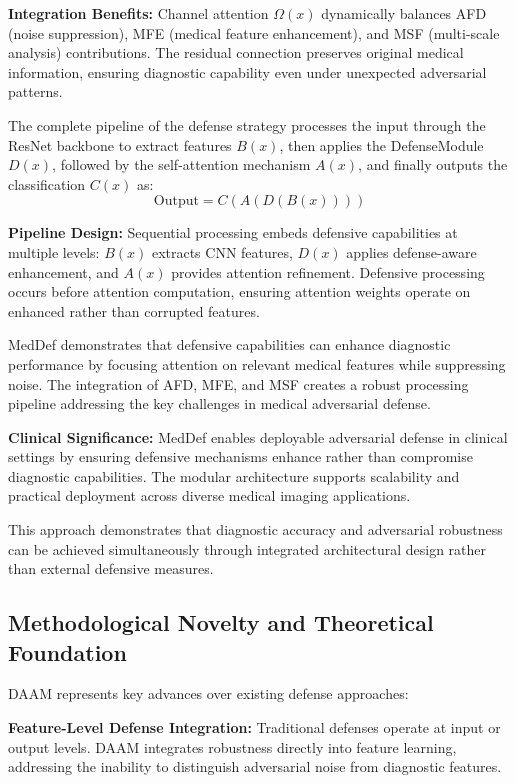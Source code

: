 \documentclass[preprint,12pt]{elsarticle}
\begin{document}
\textbf{Integration Benefits:} Channel attention $\Omega(x)$ dynamically balances AFD (noise suppression), MFE (medical feature enhancement), and MSF (multi-scale analysis) contributions. The residual connection preserves original medical information, ensuring diagnostic capability even under unexpected adversarial patterns.

The complete pipeline of the defense strategy processes the input through the ResNet backbone to extract features $B(x)$, then applies the DefenseModule $D(x)$, followed by the self-attention mechanism $A(x)$, and finally outputs the classification $C(x)$ as:
\begin{equation}
\text{Output} = C(A(D(B(x))))
\end{equation}

\textbf{Pipeline Design:} Sequential processing embeds defensive capabilities at multiple levels: $B(x)$ extracts CNN features, $D(x)$ applies defense-aware enhancement, and $A(x)$ provides attention refinement. Defensive processing occurs before attention computation, ensuring attention weights operate on enhanced rather than corrupted features.

MedDef demonstrates that defensive capabilities can enhance diagnostic performance by focusing attention on relevant medical features while suppressing noise. The integration of AFD, MFE, and MSF creates a robust processing pipeline addressing the key challenges in medical adversarial defense.

\textbf{Clinical Significance:} MedDef enables deployable adversarial defense in clinical settings by ensuring defensive mechanisms enhance rather than compromise diagnostic capabilities. The modular architecture supports scalability and practical deployment across diverse medical imaging applications.

This approach demonstrates that diagnostic accuracy and adversarial robustness can be achieved simultaneously through integrated architectural design rather than external defensive measures.

\subsection{Methodological Novelty and Theoretical Foundation}
\label{sec:novelty}

DAAM represents key advances over existing defense approaches:

\textbf{Feature-Level Defense Integration:} Traditional defenses operate at input or output levels. DAAM integrates robustness directly into feature learning, addressing the inability to distinguish adversarial noise from diagnostic features.
\end{document}
